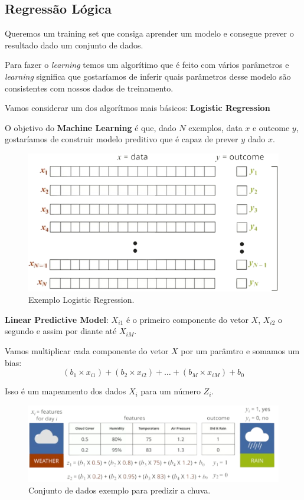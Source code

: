 \documentclass[11pt, a4paper]{article}
\begin{document}
\subsection{Regressão Lógica}

Queremos um training set que consiga aprender um modelo e consegue prever o resultado dado um conjunto de dados.

Para fazer o \textit{learning} temos um algorítimo que é feito com vários parâmetros e \textit{learning} significa que gostaríamos de inferir quais parâmetros desse modelo são consistentes com nossos dados de treinamento.

Vamos considerar um dos algorítmos mais básicos: \textbf{Logistic Regression}

O objetivo do \textbf{Machine Learning} é que, dado $N$ exemplos, data $x$ e outcome $y$, gostaríamos de construir modelo preditivo que é capaz de prever $y$ dado $x$.\\

\begin{figure}[h]
\centering
\includegraphics[scale=0.5]{exemplo-logistic-regression}
\caption{Exemplo Logistic Regression.}
\end{figure}

\textbf{Linear Predictive Model}: $X_{i1}$ é o primeiro componente do vetor $X$, $X_{i2}$ o segundo e assim por diante até $X_{iM}$.

Vamos multiplicar cada componente do vetor $X$ por um parâmtro e somamos um bias:
$$(b_1 \times x_{i1}) + (b_2 \times x_{i2}) + \dots + (b_M \times x_{iM}) + b_0 $$

Isso é um mapeamento dos dados $X_i$ para um número $Z_i$.

\begin{figure}[h]
\centering
\includegraphics[scale=0.5]{exemplo-chuva}
\caption{Conjunto de dados exemplo para predizir a chuva.}
\end{figure}
\end{document}
